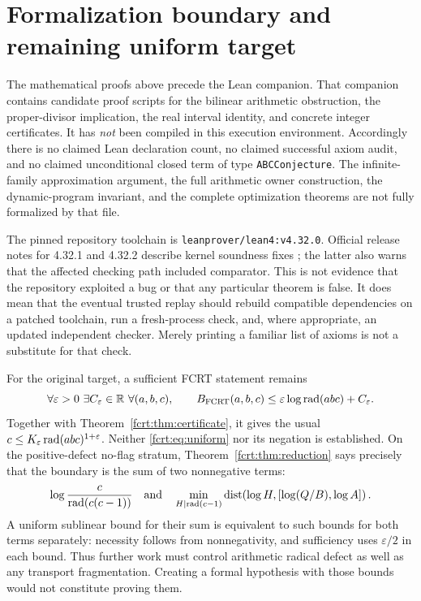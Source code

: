 \section{Formalization boundary and remaining uniform target}
The mathematical proofs above precede the Lean companion. That companion
contains candidate proof scripts for the bilinear arithmetic obstruction,
the proper-divisor implication, the real interval identity, and concrete
integer certificates. It has \emph{not} been compiled in this execution
environment. Accordingly there is no claimed Lean declaration count, no
claimed successful axiom audit, and no claimed unconditional closed term
of type \texttt{ABCConjecture}. The infinite-family approximation argument,
the full arithmetic owner construction, the dynamic-program invariant, and
the complete optimization theorems are not fully formalized by that file.

The pinned repository toolchain is \texttt{leanprover/lean4:v4.32.0}.
Official release notes for 4.32.1 and 4.32.2 describe kernel soundness fixes
\cite{fcrt:lean321,fcrt:lean322}; the latter also warns that the affected checking path
included comparator. This is not evidence that the repository exploited a
bug or that any particular theorem is false. It does mean that the eventual
trusted replay should rebuild compatible dependencies on a patched toolchain,
run a fresh-process check, and, where appropriate, an updated independent
checker. Merely printing a familiar list of axioms is not a substitute for
that check.

For the original target, a sufficient FCRT statement remains
\begin{equation}\label{fcrt:eq:uniform}
 \forall\varepsilon>0\ \exists C_\varepsilon\in\mathbb R\
 \forall (a,b,c),\qquad
 B_{\mathrm{FCRT}}(a,b,c)\le\varepsilon\log\operatorname{rad}(abc)+C_\varepsilon.
\end{equation}
Together with Theorem~\ref{fcrt:thm:certificate}, it gives the usual
\(c\le K_\varepsilon\operatorname{rad}(abc)^{1+\varepsilon}\).
Neither \eqref{fcrt:eq:uniform} nor its negation is established.
On the positive-defect no-flag stratum, Theorem~\ref{fcrt:thm:reduction} says
precisely that the boundary is the sum of two nonnegative terms:
\[
 \log\frac{c}{\operatorname{rad}(c(c-1))}
 \quad\text{and}\quad
 \min_{H\mid\operatorname{rad}(c-1)}\operatorname{dist}\!\left(\log H,
       [\log(Q/B),\log A]\right).
\]
A uniform sublinear bound for their sum is equivalent to such bounds for
both terms separately: necessity follows from nonnegativity, and sufficiency
uses \(\varepsilon/2\) in each bound. Thus further work must control
arithmetic radical defect as well as any transport fragmentation. Creating a
formal hypothesis with those bounds would not constitute proving them.

